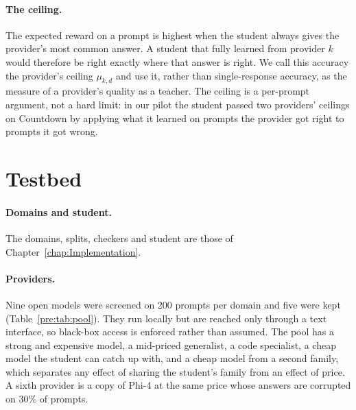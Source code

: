 \paragraph{The ceiling.} The expected reward on a prompt is highest when the student always
gives the provider's most common answer. A student that fully learned from provider $k$
would therefore be right exactly where that answer is right. We call this accuracy the
provider's ceiling $\mu_{k,d}$ and use it, rather than single-response accuracy, as the
measure of a provider's quality as a teacher. The ceiling is a per-prompt argument, not a
hard limit: in our pilot the student passed two providers' ceilings on Countdown by applying
what it learned on prompts the provider got right to prompts it got wrong.

\section{Testbed}
\label{pre:sec:testbedsetup}

\paragraph{Domains and student.} The domains, splits, checkers and student are those of
Chapter~\ref{chap:Implementation}.

\paragraph{Providers.} Nine open models were screened on 200 prompts per domain and five
were kept (Table~\ref{pre:tab:pool}). They run locally but are reached only through a text
interface, so black-box access is enforced rather than assumed. The pool has a strong and
expensive model, a mid-priced generalist, a code specialist, a cheap model the student can
catch up with, and a cheap model from a second family, which separates any effect of
sharing the student's family from an effect of price. A sixth provider is a copy of Phi-4
at the same price whose answers are corrupted on 30\% of prompts.

